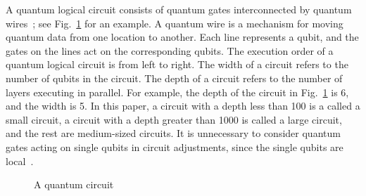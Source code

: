 \documentclass[runningheads]{llncs}
\newcommand{\leaveout}[1]{}
\begin{document}
A quantum logical circuit 
consists of quantum gates interconnected by quantum wires~\cite{Daei2020}; see Fig.~\ref{OriginalCircuit} for an example.
A quantum wire is a mechanism for moving quantum data from one location to another.
Each line represents a qubit, and the gates on the lines act on the corresponding qubits.
The execution order of a quantum logical circuit  is from left to right.
The width %
of a circuit refers to the number of qubits in the circuit.
The depth %
of a circuit refers to the number of layers executing in parallel.
For example, the depth of the circuit in Fig.~\ref{OriginalCircuit} is 6, and the width is 5.
In this paper, a circuit with a depth less than 100 is a called a small circuit,
a circuit with a depth greater than 1000 is called a large circuit,
and the rest are medium-sized circuits.
It is unnecessary to consider quantum gates acting on single qubits in circuit adjustments, since the single qubits are local~\cite{Shafaei2013}.
\begin{figure}[t] 
	\begin{center}
		  {
	}
	\end{center}					 
	\caption{A quantum circuit}
	\label{OriginalCircuit}	
\end{figure}
\end{document}
